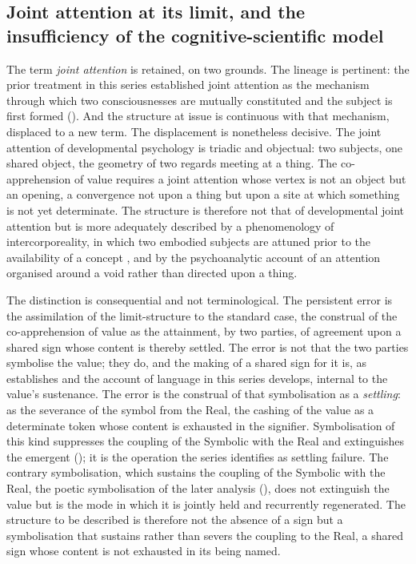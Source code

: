 \subsection{Joint attention at its limit, and the insufficiency of the cognitive-scientific model}
\label{p10:sec:limit}

The term \emph{joint attention} is retained, on two grounds. The lineage is pertinent: the prior treatment in this series established joint attention as the mechanism through which two consciousnesses are mutually constituted and the subject is first formed (). And the structure at issue is continuous with that mechanism, displaced to a new term. The displacement is nonetheless decisive. The joint attention of developmental psychology is triadic and objectual: two subjects, one shared object, the geometry of two regards meeting at a thing. The co-apprehension of value requires a joint attention whose vertex is not an object but an opening, a convergence not upon a thing but upon a site at which something is not yet determinate. The structure is therefore not that of developmental joint attention but is more adequately described by a phenomenology of intercorporeality, in which two embodied subjects are attuned prior to the availability of a concept \parencite{merleau2012}, and by the psychoanalytic account of an attention organised around a void rather than directed upon a thing.

The distinction is consequential and not terminological. The persistent error is the assimilation of the limit-structure to the standard case, the construal of the co-apprehension of value as the attainment, by two parties, of agreement upon a shared sign whose content is thereby settled. The error is not that the two parties symbolise the value; they do, and the making of a shared sign for it is, as  establishes and the account of language in this series develops, internal to the value's sustenance. The error is the construal of that symbolisation as a \emph{settling}: as the severance of the symbol from the Real, the cashing of the value as a determinate token whose content is exhausted in the signifier. Symbolisation of this kind suppresses the coupling of the Symbolic with the Real and extinguishes the emergent (); it is the operation the series identifies as settling failure. The contrary symbolisation, which sustains the coupling of the Symbolic with the Real, the poetic symbolisation of the later analysis (), does not extinguish the value but is the mode in which it is jointly held and recurrently regenerated. The structure to be described is therefore not the absence of a sign but a symbolisation that sustains rather than severs the coupling to the Real, a shared sign whose content is not exhausted in its being named.

